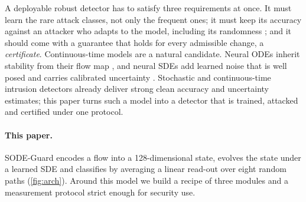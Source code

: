 \documentclass{article}
\theoremstyle{definition}
\begin{document}
A deployable robust detector has to satisfy three requirements at once. It must
learn the rare attack classes, not only the frequent ones; it must keep its
accuracy against an attacker who adapts to the model, including its
randomness \citep{athalye2018obfuscated,carlini2019evaluating}; and it should
come with a guarantee that holds for every admissible change, a
\emph{certificate}. Continuous-time models are a natural candidate. Neural ODEs
inherit stability from their flow map \citep{kang2021sodef}, and neural SDEs
\citep{tzen2019nsde,li2020scalable} add learned noise that is well posed and
carries calibrated uncertainty \citep{oh2024stablesde,liu2020sdenoise}.
Stochastic and continuous-time intrusion detectors
\citep{anaedevha2026ode,anaedevha2026mstgnn} already deliver
strong clean accuracy and uncertainty estimates; this paper turns such a model
into a detector that is trained, attacked and certified under one protocol.

\paragraph{This paper.} SODE-Guard encodes a flow into a 128-dimensional state,
evolves the state under a learned SDE and classifies by averaging a linear
read-out over eight random paths (\cref{fig:arch}). Around this model we build
a recipe of three modules and a measurement protocol strict enough for
security use.
\end{document}
